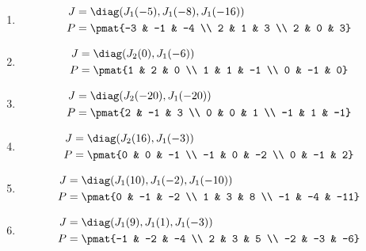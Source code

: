 \begin{enumerate}
\item

\begin{align*}
J &= \diag(J_{1}(-5), J_{1}(-8), J_{1}(-16))\\
P &= \pmat{-3 & -1 & -4 \\ 2 & 1 & 3 \\ 2 & 0 & 3}
\end{align*}

\item

\begin{align*}
J &= \diag(J_{2}(0), J_{1}(-6))\\
P &= \pmat{1 & 2 & 0 \\ 1 & 1 & -1 \\ 0 & -1 & 0}
\end{align*}

\item

\begin{align*}
J &= \diag(J_{2}(-20), J_{1}(-20))\\
P &= \pmat{2 & -1 & 3 \\ 0 & 0 & 1 \\ -1 & 1 & -1}
\end{align*}

\item

\begin{align*}
J &= \diag(J_{2}(16), J_{1}(-3))\\
P &= \pmat{0 & 0 & -1 \\ -1 & 0 & -2 \\ 0 & -1 & 2}
\end{align*}

\item

\begin{align*}
J &= \diag(J_{1}(10), J_{1}(-2), J_{1}(-10))\\
P &= \pmat{0 & -1 & -2 \\ 1 & 3 & 8 \\ -1 & -4 & -11}
\end{align*}

\item

\begin{align*}
J &= \diag(J_{1}(9), J_{1}(1), J_{1}(-3))\\
P &= \pmat{-1 & -2 & -4 \\ 2 & 3 & 5 \\ -2 & -3 & -6}
\end{align*}


\end{enumerate}
